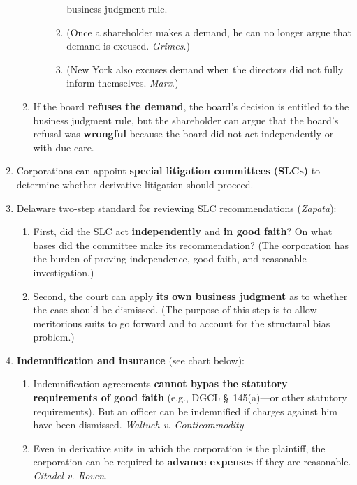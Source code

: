 \begin{enumerate}
\begin{enumerate}
\begin{enumerate}
\begin{enumerate}
                business judgment rule.
                \item (Once a shareholder makes a demand, he can no longer 
                argue that demand is excused. \emph{Grimes}.)
                \item (New York also excuses demand when the directors did not 
                fully inform themselves. \emph{Marx}.)
            \end{enumerate}
        \end{enumerate}
        \item If the board \textbf{refuses the demand}, the board's decision 
        is entitled to the business judgment rule, but the shareholder can 
        argue that the board's refusal was \textbf{wrongful} because the board 
        did not act independently or with due care.
    \end{enumerate}
    \item Corporations can appoint \textbf{special litigation committees 
    (SLCs)} to determine whether derivative litigation should proceed.
    \item Delaware two-step standard for reviewing SLC recommendations 
    (\emph{Zapata}):
    \begin{enumerate}
        \item First, did the SLC act \textbf{independently} and \textbf{in 
        good faith}? On what bases did the committee make its recommendation? 
        (The corporation has the burden of proving independence, good faith, 
        and reasonable investigation.)
        \item Second, the court can apply \textbf{its own business judgment} 
        as to whether the case should be dismissed. (The purpose of this step 
        is to allow meritorious suits to go forward and to account for the 
        structural bias problem.)
    \end{enumerate}
    \item \textbf{Indemnification and insurance} (see chart below):
    \begin{enumerate}
        \item Indemnification agreements \textbf{cannot bypas the statutory 
        requirements of good faith} (e.g., DGCL \S\ 145(a)---or other 
        statutory requirements). But an officer can be indemnified if charges 
        against him have been dismissed. \emph{Waltuch v. Conticommodity}.
        \item Even in derivative suits in which the corporation is the 
        plaintiff, the corporation can be required to \textbf{advance 
        expenses} if they are reasonable. \emph{Citadel v. Roven}.
    \end{enumerate}
\end{enumerate}

